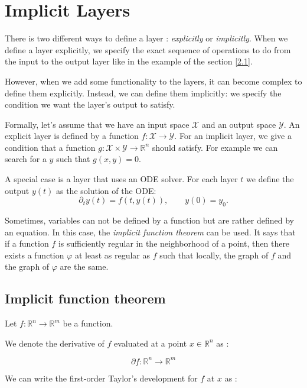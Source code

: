 \documentclass[10pt,a4paper]{article}
\theoremstyle{definition}
\theoremstyle{definition}
\begin{document}

\section{Implicit Layers}

There is two different ways to define a layer : \textit{explicitly} or \textit{implicitly}. When we define a layer explicitly, we specify the exact sequence of operations to do from the input to the output layer like in the example of the section \ref{2.1}. 

However, when we add some functionality to the layers, it can become complex to define them explicitly. Instead, we can define them implicitly: we specify the condition we want the layer's output to satisfy. 

Formally, let's assume that we have an input space $\mathcal{X}$ and an output space $\mathcal{Y}$. An explicit layer is defined by a function $f : \mathcal{X} \rightarrow \mathcal{Y}$. For an implicit layer, we give a condition that a function $g: \mathcal{X} \times \mathcal{Y} \rightarrow \mathbb{R}^n$ should satisfy. For example we can search for a $y$ such that $g(x,y) = 0$.

A special case is a layer that uses an ODE solver. For each layer $t$ we define the output $y(t)$ as the solution of the ODE:
$$\partial_t y(t) = f(t, y(t)), \qquad y(0) = y_0.$$

Sometimes, variables can not be defined by a function but are rather defined by an equation. In this case, the \textit{implicit function theorem} can be used. It says that if a function $f$ is sufficiently regular in the neighborhood of a point, then there exists a function $\varphi$ at least as regular as $f$ such that locally, the graph of $f$ and the graph of $\varphi$ are the same.

\subsection{Implicit function theorem}

Let $f: \mathbb{R}^n \rightarrow \mathbb{R}^m$ be a function.

We denote the derivative of $f$ evaluated at a point $x \in \mathbb{R}^n$ as :

\[ \partial f : \mathbb{R}^n \rightarrow \mathbb{R}^m \]

We can write the first-order Taylor's development for $f$ at $x$ as :
\end{document}

